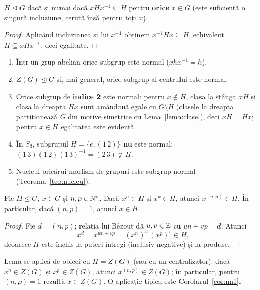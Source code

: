 \begin{propozitie}\label{prop:normalcrit}
$H\trianglelefteq G$ dacă și numai dacă $xHx^{-1}\subseteq H$ pentru \textbf{orice} $x\in G$ (este suficientă o singură incluziune, cerută însă pentru toți $x$).
\end{propozitie}

\begin{proof}
Aplicând incluziunea și lui $x^{-1}$ obținem $x^{-1}Hx\subseteq H$, echivalent $H\subseteq xHx^{-1}$; deci egalitate.
\end{proof}

\begin{exemplu}\label{ex:normal}
\begin{enumerate}[label=(\alph*),nosep]
\item Într-un grup abelian orice subgrup este normal ($xhx^{-1}=h$).
\item $Z(G)\trianglelefteq G$ și, mai general, orice subgrup al centrului este normal.
\item Orice subgrup de \textbf{indice 2} este normal: pentru $x\notin H$, clasa la stânga $xH$ și clasa la dreapta $Hx$ sunt amândouă egale cu $G\setminus H$ (clasele la dreapta partiționează $G$ din motive simetrice cu Lema~\ref{lema:clase}), deci $xH=Hx$; pentru $x\in H$ egalitatea este evidentă.
\item În $S_3$, subgrupul $H=\{e,(1\,2)\}$ \textbf{nu} este normal: $(1\,3)(1\,2)(1\,3)^{-1}=(2\,3)\notin H$.
\item Nucleul oricărui morfism de grupuri este subgrup normal (Teorema~\ref{teo:nucleu}).
\end{enumerate}
\end{exemplu}

\begin{lema}\label{lema:bezoutexp}
Fie $H\le G$, $x\in G$ și $n,p\in\mathbb{N}^*$. Dacă $x^n\in H$ și $x^p\in H$, atunci $x^{(n,p)}\in H$. În particular, dacă $(n,p)=1$, atunci $x\in H$.
\end{lema}

\begin{proof}
Fie $d=(n,p)$; relația lui Bézout dă $u,v\in\mathbb{Z}$ cu $un+vp=d$. Atunci
\[
x^{d}=x^{un+vp}=(x^n)^u\,(x^p)^v\in H,
\]
deoarece $H$ este închis la puteri întregi (inclusiv negative) și la produse.
\end{proof}

\begin{observatie}
Lema se aplică de obicei cu $H=Z(G)$ (sau cu un centralizator): dacă $x^n\in Z(G)$ și $x^p\in Z(G)$, atunci $x^{(n,p)}\in Z(G)$; în particular, pentru $(n,p)=1$ rezultă $x\in Z(G)$. O aplicație tipică este Corolarul~\ref{cor:nn1}.
\end{observatie}

